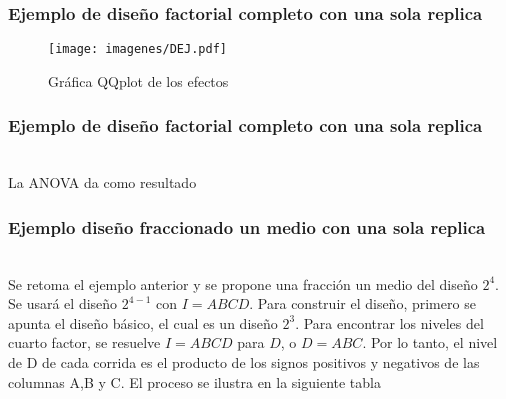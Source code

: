 \documentclass[12pt]{beamer}
\begin{document}
\begin{frame}
\frametitle{Ejemplo de diseño factorial completo con una sola replica}

\begin{figure}[h!]
  \centering
  \texttt{[image: imagenes/DEJ.pdf]}
  \caption{Gráfica QQplot de los efectos}
\end{figure}
\end{frame}

\begin{frame}
\frametitle{Ejemplo de diseño factorial completo con una sola replica}
~\\La ANOVA da como resultado
\begin{table}[H]
  \centering
  \caption{Análisis de varianza una sola réplica}
  \label{tab:addlabel}%
\end{table}%
\end{frame}

\begin{frame}
\frametitle{Ejemplo diseño fraccionado un medio con una sola replica}

~\\Se retoma el ejemplo anterior y se propone una fracción un medio del diseño $2^4$. Se usará el diseño $2^{4-1}$ con $I=ABCD$. Para construir el diseño, primero se apunta el diseño básico, el cual es un diseño $2^3$. Para encontrar los niveles del cuarto factor, se resuelve $I=ABCD$ para $D$, o $D=ABC$. Por lo tanto, el nivel de D de cada corrida es el producto de los signos positivos y negativos de las columnas A,B y C. El proceso se ilustra en la siguiente tabla
\end{frame}
\end{document}
